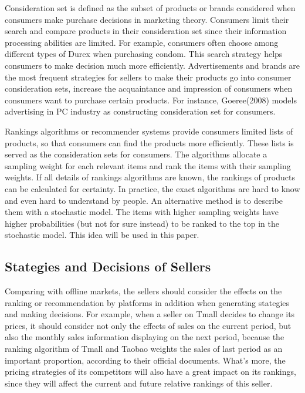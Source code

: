 \documentclass{article}
\begin{document}
Consideration set is defined as the subset of products or brands considered when consumers make purchase decisions in marketing theory. Consumers limit their search and compare products in their consideration set since their information processing abilities are limited. For example, consumers often choose among different types of Durex when purchasing condom. This search strategy helps consumers to make decision much more efficiently. Advertisements and brands are the most frequent strategies for sellers to make their products go into consumer consideration sets, increase the acquaintance and impression of consumers when consumers want to purchase certain products.
For instance, Goeree(2008) models advertising in PC industry as constructing consideration set for consumers.

Rankings algorithms or recommender systems provide consumers limited lists of products, so that consumers can find the products more efficiently. These lists is served as the consideration sets for consumers. The algorithms allocate a sampling weight for each relevant items and rank the items with their sampling weights. If all details of rankings algorithms are known, the rankings of products can be calculated for certainty. In practice, the exact algorithms are hard to know and even hard to understand by people. An alternative method is to describe them with a stochastic model. The items with higher sampling weights have higher probabilities (but not for sure instead) to be ranked to the top in the stochastic model. This idea will be used in this paper.    


\subsection{Stategies and Decisions of Sellers}

Comparing with offline markets, the sellers should consider the effects on the ranking or recommendation by platforms in addition when generating stategies and making decisions. For example, when a seller on Tmall decides to change its prices, it should consider not only the effects of sales on the current period, but also the monthly sales information displaying on the next period, because the ranking algorithm of Tmall and Taobao weights the sales of last period as an important proportion, according to their official documents. What's more, the pricing strategies of its competitors will also have a great impact on its rankings, since they will affect the current and future relative rankings of this seller.
\end{document}
